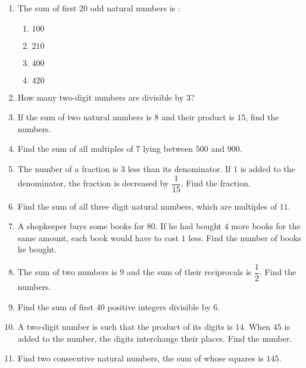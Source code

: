 \begin{enumerate}
\item The sum of first 20 odd natural numbers is : 
\begin{enumerate}
\item $100$ 
\item $210$ 
\item $400$ 
\item $420$ 
\end{enumerate}
\item How many two-digit numbers are divisible by 3? 
\item If the sum of two natural numbers is $8$ and their product is $15$, find the numbers. 
\item Find the sum of all multiples of 7 lying between $500$ and $900$. 
\item The number of a fraction is $3$ less than its denominator. If $1$ is added to the denominator, the fraction is decreased by $\dfrac{1}{15}$. Find the fraction. 

\item Find the sum of all three digit natural numbers, which are multiples of $11$. 
\item A shopkeeper buys some books for \rupee $80$. If he had bought $4$ more books for the same amount, each book would have to cost \rupee $1$ less. Find the number of books he bought. 

\item The sum of two numbers is $9$ and the sum of their reciprocals is $\dfrac{1}{2}$. Find the numbers. 
\item Find the sum of first 40 positive integers divisible by $6$. 
\item A two-digit number is such that the product of its digits is $14$. When $45$ is added to the number, the digits interchange their places. Find the number. 
\item Find two consecutive natural numbers, the sum of whose squares is $145$. 
\end{enumerate}
